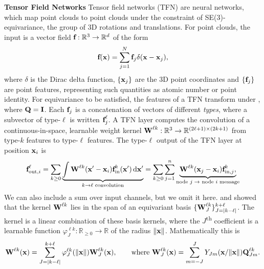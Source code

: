 \documentclass{article}
\begin{document}
\textbf{Tensor Field Networks}
\label{sec:background-tfn}
Tensor field networks (TFN) \citep{ThomasSKYKR18} are neural networks, which map point clouds to point clouds under the constraint of SE(3)-equivariance, the group of 3D rotations and translations. For point clouds, the input is a vector field $\textbf{f}: \mathbb{R}^3 \to \mathbb{R}^d$ of the form
\begin{align}
    \textbf{f}(\textbf{x}) = \sum_{j=1}^N \textbf{f}_j \delta(\textbf{x} - \textbf{x}_j), \label{eq:point-cloud}
\end{align}
where $\delta$ is the Dirac delta function, $\{\textbf{x}_j\}$ are the 3D point coordinates and $\{\textbf{f}_j\}$ are point features, representing such quantities as atomic number or point identity. For equivariance to be satisfied, the features of a TFN transform under , where $\textbf{Q}=\textbf{I}$. Each $\textbf{f}_j$ is a concatenation of vectors of different \emph{types}, where a subvector of type-$\ell$ is written $\textbf{f}_j^\ell$. A TFN layer computes the convolution of a continuous-in-space, learnable weight kernel $\textbf{W}^{\ell k}: \mathbb{R}^3 \to \mathbb{R}^{(2\ell+1)\times(2k+1)}$ from type-$k$ features to type-$\ell$ features. The type-$\ell$ output of the TFN layer at position $\textbf{x}_i$ is
\begin{align}
    \textbf{f}_{\text{out},i}^{\ell} = \sum_{k\geq 0} \underbrace{\int \textbf{W}^{\ell k}(\textbf{x}'-\textbf{x}_i) \textbf{f}_{\text{in}}^k(\textbf{x}') \, \mathrm{d}\textbf{x}'}_{k \to \ell \text{ convolution}} = \sum_{k\geq 0}\sum_{j=1}^n \underbrace{\textbf{W}^{\ell k}(\textbf{x}_j - \textbf{x}_i) \textbf{f}_{\text{in},j}^k,}_{\text{node $j \to$ node $i$ message}} \label{eq:tf-layer}
\end{align}
We can also include a sum over input channels, but we omit it here. \citet{WeilerGWBC18, ThomasSKYKR18} and \citet{kondor2018nbody} showed that the kernel $\textbf{W}^{\ell k}$ lies in the span of an equivariant basis $\{\textbf{W}_J^{\ell k}\}_{J=|k-\ell|}^{k+\ell}$. The kernel is a linear combination of these basis kernels, where the $J$\textsuperscript{th} coefficient is a learnable function $\varphi_J^{\ell k}: \mathbb{R}_{\geq 0} \to \mathbb{R}$ of the radius $\|\textbf{x}\|$. Mathematically this is
\begin{align}
    \textbf{W}^{\ell k}(\textbf{x}) = \sum_{J = |k-\ell|}^{k+\ell} \varphi_J^{\ell k}(\|\textbf{x}\|) \textbf{W}_{J}^{\ell k}(\textbf{x}), \qquad \text{where } \textbf{W}_{J}^{\ell k}(\textbf{x}) = \sum_{m=-J}^J Y_{Jm}(\textbf{x} / \|\textbf{x}\|) \textbf{Q}_{Jm}^{\ell k}. \label{eq:equivariant-kernel}
\end{align}
\end{document}
